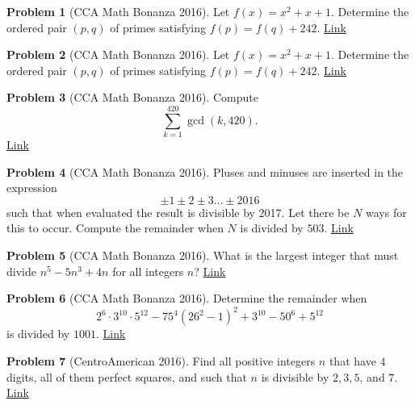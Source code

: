 \documentclass[]{article}
\theoremstyle{definition}
\newtheorem{problem}{Problem}
\begin{document}
\begin{problem}[CCA Math Bonanza 2016]
	Let $f(x) = x^2 + x + 1$. Determine the ordered pair $(p,q)$ of primes satisfying $f(p) = f(q) + 242$. \hfill \href{http://artofproblemsolving.com/community/c4h1249117p6423872}{Link}
\end{problem}



\begin{problem}[CCA Math Bonanza 2016]
	Let $f(x) = x^2 + x + 1$. Determine the ordered pair $(p,q)$ of primes satisfying $f(p) = f(q) + 242$. \hfill \href{http://artofproblemsolving.com/community/c4h1249117p6423872}{Link}
\end{problem}



\begin{problem}[CCA Math Bonanza 2016]
	Compute \[\sum_{k=1}^{420} \gcd(k,420).\]
	\flushright \href{http://artofproblemsolving.com/community/c4h1249124p6423895}{Link}
\end{problem}



\begin{problem}[CCA Math Bonanza 2016]
	Pluses and minuses are inserted in the expression \[\pm 1 \pm 2 \pm 3 \dots \pm 2016\]such that when evaluated the result is divisible by 2017. Let there be $N$ ways for this to occur. Compute the remainder when $N$ is divided by $503$. \hfill \href{http://artofproblemsolving.com/community/c4h1249141p6423961}{Link}
\end{problem}



\begin{problem}[CCA Math Bonanza 2016]
	What is the largest integer that must divide $n^5-5n^3+4n$ for all integers $n$? \hfill \href{http://artofproblemsolving.com/community/c4h1249149p6423999}{Link}
\end{problem}



\begin{problem}[CCA Math Bonanza 2016]
	Determine the remainder when $$2^6\cdot3^{10}\cdot5^{12}-75^4\left(26^2-1\right)^2+3^{10}-50^6+5^{12}$$is divided by $1001$. \href{http://artofproblemsolving.com/community/c4h1249159p6424026}{Link}
\end{problem}



\begin{problem}[CentroAmerican 2016]
	Find all positive integers $n$ that have $4$ digits, all of them perfect squares, and such that $n$ is divisible by $2, 3, 5$, and $7$. \hfill \href{http://artofproblemsolving.com/community/c6h1259646p6532180}{Link}
\end{problem}
\end{document}
